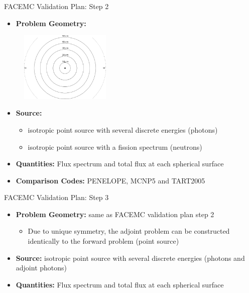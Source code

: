 \documentclass{beamer}
\begin{document}
\begin{frame}{FACEMC Validation Plan: Step 2}
  
  \begin{itemize}
    \item \textbf{Problem Geometry:}
  \end{itemize}
      
  \begin{figure}[h!]
    \begin{center}
      \includegraphics[width=1.7in]{figures/code_comparison_problem.pdf}
    \end{center}
  \end{figure}

  \begin{itemize}
    \item \textbf{Source:}
      \begin{itemize}
        \item isotropic point source with several discrete energies (photons)
        \item isotropic point source with a fission spectrum (neutrons)
      \end{itemize}
      \medskip
    \item \textbf{Quantities:} Flux spectrum and total flux at each spherical 
      surface
      \medskip
    \item \textbf{Comparison Codes:} PENELOPE, MCNP5 and TART2005 
  \end{itemize}
  
\end{frame}

\begin{frame}{FACEMC Validation Plan: Step 3}

  \begin{itemize}
    \item \textbf{Problem Geometry:} same as FACEMC validation plan step 2
      \begin{itemize}
        \item Due to unique symmetry, the adjoint problem can be constructed 
          identically to the forward problem (point source)
      \end{itemize}
      \bigskip
      \bigskip
    \item \textbf{Source:} isotropic point source with several discrete
      energies (photons and adjoint photons)
      \bigskip
      \bigskip
    \item \textbf{Quantities:} Flux spectrum and total flux at each spherical 
      surface

  \end{itemize}    

\end{frame}
\end{document}

